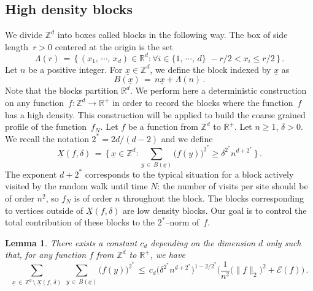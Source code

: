\documentclass[10pt]{amsart}
\newtheorem{lemm}[theo]{Lemma}\newtheorem{prop}[theo]{Proposition}\newtheorem{coro}[theo]{Corollary}\newtheorem{conj}[theo]{Conjecture}
\theoremstyle{definition}\newtheorem{defi}[theo]{Definition}\newtheorem{rema}[theo]{Remark}\newtheorem{exam}[theo]{Example}\newtheorem{exem}[theo]{Example}\newtheorem{nota}[theo]{Notation}
\newcommand{\XX}{{\underline{X}}}
\newcommand{\xx}{{\underline{x}}}
\newcommand*\Zd {{\mathbb Z^d}}
\newcommand*\Rd {{\mathbb R^d}}
\newcommand*\R{\mathbb{R}}
\newcommand*\La {{\Lambda}}
\newcommand{\cE}{\mathcal{E}}
\let\oldforall\forall
\renewcommand*{\forall}{\mathrel{\oldforall}}
\begin{document}
\subsection{High density blocks}\label{deco}
We divide $\Zd$ into boxes called blocks in the following way. The box of side length~$r>0$ centered at the origin is the set
\[
\Lambda(r) \,=\, \big\{\,(x_1,\,\cdots,\,x_d)\in\R^d :
\forall i\in \{1,\,\cdots,\,d\}\,\, -r/2<x_i\leq r/2
\,\big\}\,.
\]
Let $n$ be a positive integer. For $\xx\in \Zd$, we define the block indexed by $\xx$ as
\[
B(\xx)\, =\, n\xx+\La(n)\,.
\]
Note that the blocks partition $\Rd$. We perform here a deterministic construction on any function~$f:\Zd\to\R^+$ in order to record the blocks where the function~$f$ has a high density. This construction will be applied to build the coarse grained profile of the function~$f_N$. Let $f$ be a function from $\Zd$ to $\R^+$. Let $n\geq1$, $\delta>0$. We recall the notation $2^*=2d/(d-2)$ and we define
\[
\XX(f,\delta)\,=\,\Big\{\,\xx\in\Zd:
\sum_{y\,\in\,B(\xx)}\big(f(y)\big)^{2^*}\geq
\delta^{2^*} n^{d+2^*}
\,\Big\}\,.
\]
The exponent $d+2^*$ corresponds to the typical situation for a block actively visited by the random walk until time $N$: the number of visits per site should be of order $n^2$, so $f_N$ is of order $n$ throughout the block. The blocks corresponding to vertices outside of $\XX(f,\delta)$ are low density blocks. Our goal is to control the total contribution of these blocks to the $2^*$--norm of~$f$.
\begin{lemm}\label{contout}
There exists a constant $c_d$ depending on the dimension $d$ only such that, for any function $f$ from $\Zd$ to $\R^+$, we have
\[
\sum_{\xx\,\in\,\Zd\,\setminus\,\XX(f,\,\delta)}\:
\sum_{y\,\in\,B(\xx)}
\big(f(y)\big)^{2^*}\,\leq\, c_d\big(
\delta^{2^*} n^{d+2^*}
\big)^{1-2/2^*}
\bigg(\frac{1}{n^2}
\big(\|f\|_{2}\big)^2+{\cE(f)}\bigg)\,.
\]
\end{lemm}
\end{document}

